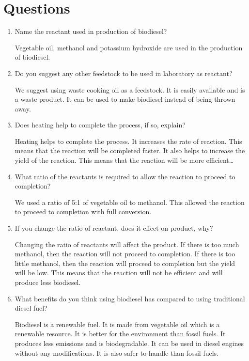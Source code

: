 \documentclass[a4paper, 12pt, english]{article}
\begin{document}
\section{Questions}
\begin{enumerate}
	\item Name the reactant used in production of biodiesel?

	      Vegetable oil, methanol and potassium hydroxide are used in the production of
	      biodiesel.

	\item Do you suggest any other feedstock to be used in laboratory as reactant?

	      We suggest using waste cooking oil as a feedstock. It is easily available and
	      is a waste product. It can be used to make biodiesel instead of being thrown
	      away.

	\item Does heating help to complete the process, if so, explain?

	      Heating helps to complete the process. It increases the rate of reaction. This
	      means that the reaction will be completed faster. It also helps to increase the
	      yield of the reaction. This means that the reaction will be more efficient\dots

	\item What ratio of the reactants is required to allow the reaction to proceed to
	      completion?

	      We used a ratio of 5:1 of vegetable oil to methanol. This allowed the reaction
	      to proceed to completion with full conversion.

	\item If you change the ratio of reactant, does it effect on product, why?

	      Changing the ratio of reactants will affect the product. If there is too much
	      methanol, then the reaction will not proceed to completion. If there is too
	      little methanol, then the reaction will proceed to completion but the yield
	      will be low. This means that the reaction will not be efficient and will
	      produce less biodiesel.

	\item What benefits do you think using biodiesel has compared to using traditional
	      diesel fuel?

	      Biodiesel is a renewable fuel. It is made from vegetable oil which is a
	      renewable resource. It is better for the environment than fossil fuels. It
	      produces less emissions and is biodegradable. It can be used in diesel engines
	      without any modifications. It is also safer to handle than fossil fuels.


\end{enumerate}
\end{document}
